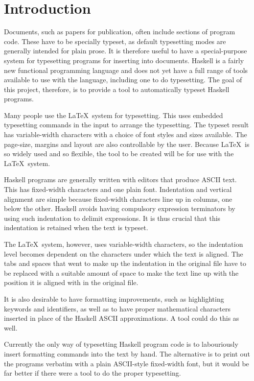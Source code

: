 \chapter{Introduction}

Documents, such as papers for publication, often include sections
of program code.  These have to be specially typeset, as default
typesetting modes are generally intended for plain prose.
It is therefore useful to have a special-purpose system for typesetting
programs for inserting into documents.
Haskell \cite{Haskell-report} is a fairly new functional programming language and does not
yet have a full range of tools available to use with the language,
including one to do typesetting.
The goal of this project, therefore, is to provide a tool to automatically
typeset Haskell programs.

Many people use the \LaTeX\ system \cite{LaTeX-book}
for typesetting.  This uses
embedded typesetting commands in the input to arrange the typesetting.
The typeset result has variable-width characters with a choice of
font styles and sizes available.  The page-size, margins and layout
are also controllable by the user.  Because \LaTeX\ is so widely used and
so flexible, the tool to be created will be
for use with the \LaTeX\ system.

Haskell programs are generally written with editors that produce ASCII
text.  This has fixed-width characters and one plain font.
Indentation and vertical alignment are simple because
fixed-width characters line up in columns, one below the other.  
Haskell avoids having compulsory expression terminators 
by using such indentation to delimit expressions.  It is thus crucial 
that this indentation is retained when the text is typeset.

The \LaTeX\ system, however, uses variable-width characters, so the indentation
level becomes dependent on the characters under which the text is aligned.
The tabs and spaces that went to make
up the indentation in the original file have to be replaced with a 
suitable amount of space to make the text line up with the position 
it is aligned with in the original file. 

It is also desirable to have formatting improvements, such as 
highlighting keywords and identifiers, as well as to have
proper mathematical characters inserted in place of the 
Haskell ASCII approximations.  A tool could do this as well.

Currently the only way of typesetting Haskell program code is to 
labouriously insert formatting
commands into the text by hand.  The alternative is to print out the programs
verbatim with a plain ASCII-style fixed-width font, but it would be far better
if there were a tool to do the proper typesetting.

